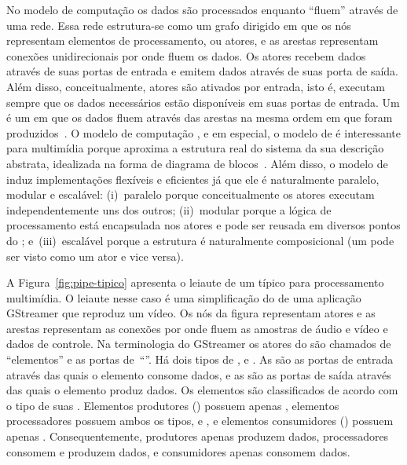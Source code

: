 \documentclass{SBCbookchapter}
\begin{document}
No modelo de computação  os dados são processados enquanto
``fluem'' através de uma rede.  Essa rede estrutura-se como um grafo
dirigido em que os nós representam elementos de processamento, ou atores, e
as arestas representam conexões unidirecionais por onde fluem os dados.  Os
atores recebem dados através de suas portas de entrada e emitem dados
através de suas porta de saída.  Além disso, conceitualmente, atores são
ativados por entrada, isto é, executam sempre que os dados necessários estão
disponíveis em suas portas de entrada.  Um  é um 
em que os dados fluem através das arestas na mesma ordem em que foram
produzidos~\cite{Kahn-G-1977,Lee-E-A-1995}.  O modelo de computação
, e em especial, o modelo de  é interessante para
multimídia porque aproxima a estrutura real do sistema da sua descrição
abstrata, idealizada na forma de diagrama de blocos~\cite{Yviquel-H-2014}.
Além disso, o modelo de  induz implementações flexíveis e
eficientes já que ele é naturalmente paralelo, modular e escalável:
(i)~paralelo porque conceitualmente os atores executam independentemente uns
dos outros; (ii)~modular porque a lógica de processamento está encapsulada
nos atores e pode ser reusada em diversos pontos do ;
e~(iii)~escalável porque a estrutura é naturalmente composicional (um
 pode ser visto como um ator e vice versa).

A Figura~\ref{fig:pipe-tipico} apresenta o leiaute de um 
típico para processamento multimídia.  O leiaute nesse caso é uma
simplificação do  de uma aplicação GStreamer que reproduz um
vídeo.  Os nós da figura representam atores e as arestas representam as
conexões por onde fluem as amostras de áudio e vídeo e dados de controle.
Na terminologia do GStreamer os atores do são chamados de ``elementos'' e as
portas de~``''.  Há dois tipos de ,  e
.  As  são as portas de entrada através das
quais o elemento consome dados, e as  são as portas de saída
através das quais o elemento produz dados.  Os elementos são classificados
de acordo com o tipo de suas .  Elementos produtores ()
possuem apenas , elementos processadores possuem ambos os
tipos,  e , e elementos consumidores
() possuem apenas .  Consequentemente, produtores
apenas produzem dados, processadores consomem e produzem dados, e
consumidores apenas consomem dados.
\end{document}
